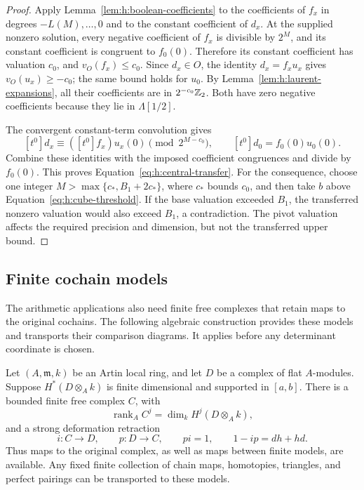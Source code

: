 \begin{proof}
Apply Lemma~\ref{lem:h:boolean-coefficients} to the coefficients of
$f_x$ in degrees $-L(M),\ldots,0$ and to the constant coefficient
of $d_x$. At the supplied nonzero solution, every negative coefficient
of $f_x$ is divisible by $2^M$, and its constant coefficient is
congruent to $f_0(0)$. Therefore its constant coefficient has valuation
$c_0$, and $v_O(f_x)\le c_0$. Since $d_x\in O$, the identity
$d_x=f_xu_x$ gives $v_O(u_x)\ge-c_0$; the same bound holds for
$u_0$. By Lemma~\ref{lem:h:laurent-expansions}, all their coefficients
are in $2^{-c_0}\mathbb Z_2$. Both have zero negative coefficients because
they lie in $\Lambda[1/2]$.

The convergent constant-term convolution gives
\[
 [t^0]d_x\equiv([t^0]f_x)u_x(0)\pmod{2^{M-c_0}},
 \qquad [t^0]d_0=f_0(0)u_0(0).
\]
Combine these identities with the imposed coefficient congruences and
divide by $f_0(0)$. This proves
Equation~\eqref{eq:h:central-transfer}. For the consequence, choose
one integer $M>\max\{c_*,B_1+2c_*\}$, where $c_*$ bounds $c_0$,
and then take $b$ above Equation~\eqref{eq:h:cube-threshold}. If the
base valuation exceeded $B_1$, the transferred nonzero valuation would
also exceed $B_1$, a contradiction. The pivot valuation affects the
required precision and dimension, but not the transferred upper bound.
\end{proof}

\subsection{Finite cochain models}
\label{sec:common-finite-models}

The arithmetic applications also need finite free complexes that retain
maps to the original cochains. The following algebraic construction
provides these models and transports their comparison diagrams.
It applies before any determinant coordinate is chosen.

\begin{lemma}\label{rl:finite-model}
\label{lem:h:finite-models}
Let $(A,\mathfrak m,k)$ be an Artin local ring, and let $D$ be a complex of
flat $A$-modules.  Suppose $H^*(D\otimes_A k)$ is finite dimensional and
supported in $[a,b]$.  There is a bounded finite free complex $C$, with
\[
 \operatorname{rank}_A C^j=\dim_k H^j(D\otimes_A k),
\]
and a strong deformation retraction
\[
 i:C\longrightarrow D,\qquad p:D\longrightarrow C,\qquad
 pi=1,\qquad 1-ip=dh+hd.
\]
Thus maps to the original complex, as well as maps between finite models,
are available.  Any fixed finite collection of chain maps, homotopies,
triangles, and perfect pairings can be transported to these models.
\end{lemma}

